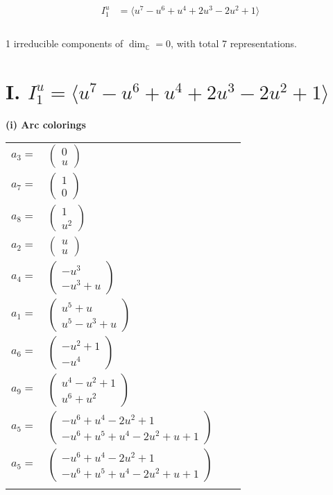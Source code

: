 \documentclass[1p]{elsarticle_modified}
\theoremstyle{definition}
\begin{document}
\begin{align*}
I^u_{1}&=\langle 
u^7- u^6+u^4+2 u^3-2 u^2+1\rangle \\
\\
\end{align*}
\raggedright * 1 irreducible components of $\dim_{\mathbb{C}}=0$, with total 7 representations.\\
\newpage
\renewcommand{\arraystretch}{1}
\centering \section*{I. $I^u_{1}= \langle u^7- u^6+u^4+2 u^3-2 u^2+1 \rangle$}
\flushleft \textbf{(i) Arc colorings}\\
\begin{tabular}{m{7pt} m{180pt} m{7pt} m{180pt} }
\flushright $a_{3}=$&$\begin{pmatrix}0\\u\end{pmatrix}$ \\
\flushright $a_{7}=$&$\begin{pmatrix}1\\0\end{pmatrix}$ \\
\flushright $a_{8}=$&$\begin{pmatrix}1\\u^2\end{pmatrix}$ \\
\flushright $a_{2}=$&$\begin{pmatrix}u\\u\end{pmatrix}$ \\
\flushright $a_{4}=$&$\begin{pmatrix}- u^3\\- u^3+u\end{pmatrix}$ \\
\flushright $a_{1}=$&$\begin{pmatrix}u^5+u\\u^5- u^3+u\end{pmatrix}$ \\
\flushright $a_{6}=$&$\begin{pmatrix}- u^2+1\\- u^4\end{pmatrix}$ \\
\flushright $a_{9}=$&$\begin{pmatrix}u^4- u^2+1\\u^6+u^2\end{pmatrix}$ \\
\flushright $a_{5}=$&$\begin{pmatrix}- u^6+u^4-2 u^2+1\\- u^6+u^5+u^4-2 u^2+u+1\end{pmatrix}$\\ \flushright $a_{5}=$&$\begin{pmatrix}- u^6+u^4-2 u^2+1\\- u^6+u^5+u^4-2 u^2+u+1\end{pmatrix}$\\&\end{tabular}
\end{document}
